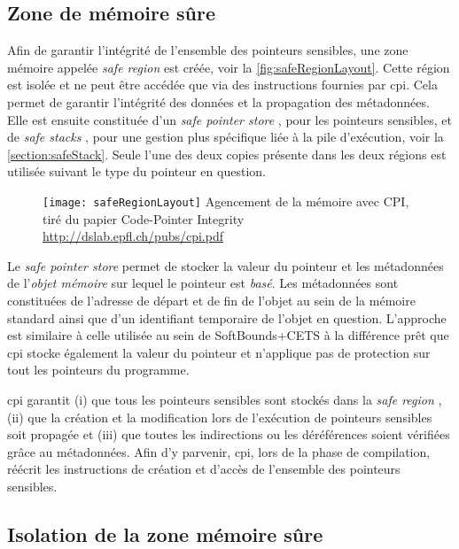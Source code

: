 \subsection{Zone de mémoire sûre}
\label{subsection:zoneMemoireSure}

Afin de garantir l'intégrité de l'ensemble des pointeurs sensibles, une zone mémoire appelée \og \textit{safe region} \fg est créée, voir la \autoref{fig:safeRegionLayout}. Cette région est isolée et ne peut être accédée que via des instructions fournies par \gls{cpi}. Cela permet de garantir l'intégrité des données et la propagation des métadonnées. Elle est ensuite constituée d'un \og \textit{safe pointer store} \fg, pour les pointeurs sensibles, et de \og \textit{safe stacks} \fg, pour une gestion plus spécifique liée à la pile d'exécution, voir la \autoref{section:safeStack}. Seule l'une des deux copies présente dans les deux régions est utilisée suivant le type du pointeur en question.

\begin{figure}[H]
	\centering
	\texttt{[image: safeRegionLayout]}
	{Agencement de la mémoire avec CPI, tiré du papier Code-Pointer Integrity}
	{\url{http://dslab.epfl.ch/pubs/cpi.pdf}}
	\label{fig:safeRegionLayout}
\end{figure}

Le \textit{safe pointer store} permet de stocker la valeur du pointeur et les métadonnées de l'\textit{objet mémoire} sur lequel le pointeur est \textit{basé}. Les métadonnées sont constituées de l'adresse de départ et de fin de l'objet au sein de la mémoire standard ainsi que d'un identifiant temporaire de l'objet en question. L'approche est similaire à celle utilisée au sein de SoftBounds+CETS \cite{SoftBound} à la différence prêt que \gls{cpi} stocke également la valeur du pointeur et n'applique pas de protection sur tout les pointeurs du programme.

\gls{cpi} garantit (i) que tous les pointeurs sensibles sont stockés dans la \og \textit{safe region} \fg, (ii) que la création et la modification lors de l'exécution de pointeurs sensibles soit propagée et (iii) que toutes les indirections ou les déréférences soient vérifiées grâce au métadonnées. Afin d'y parvenir, \gls{cpi}, lors de la phase de compilation, réécrit les instructions de création et d'accès de l'ensemble des pointeurs sensibles.


\subsection{Isolation de la zone mémoire sûre}
\label{subsection:isolationZoneMemoire}

